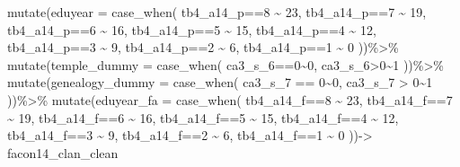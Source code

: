 \documentclass[
  oneside]{book}
\newenvironment{Shaded}{\begin{snugshade}}{\end{snugshade}}
\newcommand{\AttributeTok}[1]{\textcolor[rgb]{0.77,0.63,0.00}{#1}}
\newcommand{\DecValTok}[1]{\textcolor[rgb]{0.00,0.00,0.81}{#1}}
\newcommand{\FunctionTok}[1]{\textcolor[rgb]{0.00,0.00,0.00}{#1}}
\newcommand{\NormalTok}[1]{#1}
\newcommand{\OtherTok}[1]{\textcolor[rgb]{0.56,0.35,0.01}{#1}}
\newcommand{\SpecialCharTok}[1]{\textcolor[rgb]{0.00,0.00,0.00}{#1}}
\begin{document}
\begin{Shaded}
\begin{Highlighting}[]
  \FunctionTok{mutate}\NormalTok{(}\AttributeTok{eduyear =} \FunctionTok{case\_when}\NormalTok{(}
\NormalTok{    tb4\_a14\_p}\SpecialCharTok{==}\DecValTok{8} \SpecialCharTok{\textasciitilde{}} \DecValTok{23}\NormalTok{,}
\NormalTok{    tb4\_a14\_p}\SpecialCharTok{==}\DecValTok{7} \SpecialCharTok{\textasciitilde{}} \DecValTok{19}\NormalTok{,}
\NormalTok{    tb4\_a14\_p}\SpecialCharTok{==}\DecValTok{6} \SpecialCharTok{\textasciitilde{}} \DecValTok{16}\NormalTok{,}
\NormalTok{    tb4\_a14\_p}\SpecialCharTok{==}\DecValTok{5} \SpecialCharTok{\textasciitilde{}} \DecValTok{15}\NormalTok{,}
\NormalTok{    tb4\_a14\_p}\SpecialCharTok{==}\DecValTok{4} \SpecialCharTok{\textasciitilde{}} \DecValTok{12}\NormalTok{,}
\NormalTok{    tb4\_a14\_p}\SpecialCharTok{==}\DecValTok{3} \SpecialCharTok{\textasciitilde{}} \DecValTok{9}\NormalTok{,}
\NormalTok{    tb4\_a14\_p}\SpecialCharTok{==}\DecValTok{2} \SpecialCharTok{\textasciitilde{}} \DecValTok{6}\NormalTok{,}
\NormalTok{    tb4\_a14\_p}\SpecialCharTok{==}\DecValTok{1} \SpecialCharTok{\textasciitilde{}} \DecValTok{0}
\NormalTok{  ))}\SpecialCharTok{\%\textgreater{}\%}
  \FunctionTok{mutate}\NormalTok{(}\AttributeTok{temple\_dummy =} \FunctionTok{case\_when}\NormalTok{(}
\NormalTok{    ca3\_s\_6}\SpecialCharTok{==}\DecValTok{0}\SpecialCharTok{\textasciitilde{}}\DecValTok{0}\NormalTok{,}
\NormalTok{    ca3\_s\_6}\SpecialCharTok{\textgreater{}}\DecValTok{0}\SpecialCharTok{\textasciitilde{}}\DecValTok{1}
\NormalTok{  ))}\SpecialCharTok{\%\textgreater{}\%}
  \FunctionTok{mutate}\NormalTok{(}\AttributeTok{genealogy\_dummy =} \FunctionTok{case\_when}\NormalTok{(}
\NormalTok{    ca3\_s\_7 }\SpecialCharTok{==} \DecValTok{0}\SpecialCharTok{\textasciitilde{}}\DecValTok{0}\NormalTok{,}
\NormalTok{    ca3\_s\_7 }\SpecialCharTok{\textgreater{}} \DecValTok{0}\SpecialCharTok{\textasciitilde{}}\DecValTok{1}
\NormalTok{  ))}\SpecialCharTok{\%\textgreater{}\%}
  \FunctionTok{mutate}\NormalTok{(}\AttributeTok{eduyear\_fa =} \FunctionTok{case\_when}\NormalTok{(}
\NormalTok{    tb4\_a14\_f}\SpecialCharTok{==}\DecValTok{8} \SpecialCharTok{\textasciitilde{}} \DecValTok{23}\NormalTok{,}
\NormalTok{    tb4\_a14\_f}\SpecialCharTok{==}\DecValTok{7} \SpecialCharTok{\textasciitilde{}} \DecValTok{19}\NormalTok{,}
\NormalTok{    tb4\_a14\_f}\SpecialCharTok{==}\DecValTok{6} \SpecialCharTok{\textasciitilde{}} \DecValTok{16}\NormalTok{,}
\NormalTok{    tb4\_a14\_f}\SpecialCharTok{==}\DecValTok{5} \SpecialCharTok{\textasciitilde{}} \DecValTok{15}\NormalTok{,}
\NormalTok{    tb4\_a14\_f}\SpecialCharTok{==}\DecValTok{4} \SpecialCharTok{\textasciitilde{}} \DecValTok{12}\NormalTok{,}
\NormalTok{    tb4\_a14\_f}\SpecialCharTok{==}\DecValTok{3} \SpecialCharTok{\textasciitilde{}} \DecValTok{9}\NormalTok{,}
\NormalTok{    tb4\_a14\_f}\SpecialCharTok{==}\DecValTok{2} \SpecialCharTok{\textasciitilde{}} \DecValTok{6}\NormalTok{,}
\NormalTok{    tb4\_a14\_f}\SpecialCharTok{==}\DecValTok{1} \SpecialCharTok{\textasciitilde{}} \DecValTok{0}
\NormalTok{  ))}\OtherTok{{-}\textgreater{}}\NormalTok{ facon14\_clan\_clean}
\end{Highlighting}
\end{Shaded}
\end{document}
